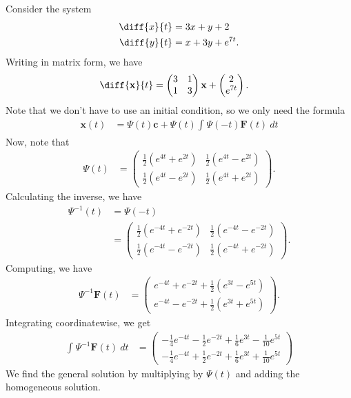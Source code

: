 \documentclass[10pt]{mypackage}
\begin{document}
\begin{example}
  Consider the system
  \begin{align*}
    \diff{x}{t} &= 3x + y + 2\\
    \diff{y}{t} &= x + 3y + e^{7t}.
  \end{align*}
  Writing in matrix form, we have
  \begin{align*}
    \diff{\mathbf{x}}{t} &= \begin{pmatrix}3 &1 \\ 1 & 3\end{pmatrix}\mathbf{x} + \begin{pmatrix}2\\e^{7t}\end{pmatrix}.
  \end{align*}
  Note that we don't have to use an initial condition, so we only need the formula
  \begin{align*}
    \mathbf{x}(t) &= \Psi(t)\mathbf{c} + \Psi(t) \int_{}^{} \Psi(-t)\mathbf{F}(t)\:dt
  \end{align*}
  Now, note that
  \begin{align*}
    \Psi(t) &= \begin{pmatrix}\frac{1}{2}\left( e^{4t} + e^{2t} \right) & \frac{1}{2}\left( e^{4t} - e^{2t} \right) \\ \frac{1}{2}\left( e^{4t} - e^{2t} \right) & \frac{1}{2}\left( e^{4t} + e^{2t} \right)\end{pmatrix}.
  \end{align*}
  Calculating the inverse, we have
  \begin{align*}
    \Psi^{-1}(t) &= \Psi\left( -t \right)\\
                 &= \begin{pmatrix}\frac{1}{2}\left( e^{-4t} + e^{-2t} \right) & \frac{1}{2}\left( e^{-4t} - e^{-2t} \right) \\ \frac{1}{2}\left( e^{-4t} - e^{-2t} \right) & \frac{1}{2}\left( e^{-4t} + e^{-2t} \right)\end{pmatrix}.
  \end{align*}
  Computing, we have
  \begin{align*}
    \Psi^{-1}\mathbf{F}(t) &= \begin{pmatrix}e^{-4t} + e^{-2t} + \frac{1}{2}\left( e^{3t} - e^{5t} \right) \\ e^{-4t} - e^{-2t} + \frac{1}{2}\left( e^{3t} + e^{5t} \right)\end{pmatrix}.
  \end{align*}
  Integrating coordinatewise, we get
  \begin{align*}
    \int_{}^{} \Psi^{-1}\mathbf{F}(t)\:dt &= \begin{pmatrix}- \frac{1}{4}e^{-4t} - \frac{1}{2}e^{-2t} + \frac{1}{6}e^{3t} - \frac{1}{10}e^{5t} \\ -\frac{1}{4}e^{-4t} + \frac{1}{2}e^{-2t} + \frac{1}{6}e^{3t} + \frac{1}{10}e^{5t}\end{pmatrix}
  \end{align*}
  We find the general solution by multiplying by $\Psi(t)$ and adding the homogeneous solution.
\end{example}
\end{document}

